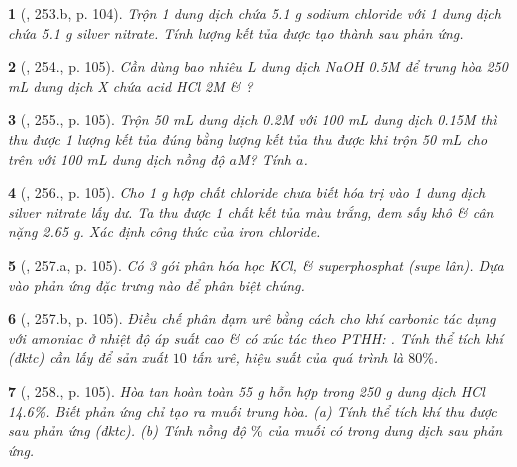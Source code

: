 \documentclass{article}
\newtheorem{baitoan}{}
\begin{document}
\begin{baitoan}[\cite{Nguyen_Buu_Can_500_BT_Hoa_Hoc_THCS}, 253.b, p. 104]
	Trộn 1 dung dịch chứa {\rm5.1 g} sodium chloride với 1 dung dịch chứa {\rm5.1 g} silver nitrate. Tính lượng kết tủa được tạo thành sau phản ứng.
\end{baitoan}

\begin{baitoan}[\cite{Nguyen_Buu_Can_500_BT_Hoa_Hoc_THCS}, 254., p. 105]
	Cần dùng bao nhiêu {\rm L} dung dịch {\rm NaOH 0.5M} để trung hòa {\rm250 mL} dung dịch X chứa acid {\rm HCl 2M \& }?
\end{baitoan}

\begin{baitoan}[\cite{Nguyen_Buu_Can_500_BT_Hoa_Hoc_THCS}, 255., p. 105]
	Trộn {\rm50 mL} dung dịch {\rm{} 0.2M} với {\rm100 mL} dung dịch {\rm{} 0.15M} thì thu được 1 lượng kết tủa đúng bằng lượng kết tủa thu được khi trộn {\rm50 mL } cho trên với {\rm100 mL} dung dịch {\rm{}} nồng độ $a${\rm M}? Tính $a$.
\end{baitoan}

\begin{baitoan}[\cite{Nguyen_Buu_Can_500_BT_Hoa_Hoc_THCS}, 256., p. 105]
	Cho {\rm1 g} hợp chất chloride chưa biết hóa trị vào 1 dung dịch silver nitrate lấy dư. Ta thu được 1 chất kết tủa màu trắng, đem sấy khô \& cân nặng {\rm2.65 g}. Xác định công thức của iron chloride.
\end{baitoan}

\begin{baitoan}[\cite{Nguyen_Buu_Can_500_BT_Hoa_Hoc_THCS}, 257.a, p. 105]
	Có 3 gói phân hóa học {\rm KCl, } \& superphosphat (supe lân). Dựa vào phản ứng đặc trưng nào để phân biệt chúng.
\end{baitoan}

\begin{baitoan}[\cite{Nguyen_Buu_Can_500_BT_Hoa_Hoc_THCS}, 257.b, p. 105]
	Điều chế phân đạm urê bằng cách cho khí carbonic tác dụng với amoniac {\rm{}} ở nhiệt độ áp suất cao \& có xúc tác theo {\rm PTHH}: {\rm{}}. Tính thể tích khí {\rm{}} (đktc) cần lấy để sản xuất $10$ tấn urê, hiệu suất của quá trình là $80\%$.
\end{baitoan}

\begin{baitoan}[\cite{Nguyen_Buu_Can_500_BT_Hoa_Hoc_THCS}, 258., p. 105]
	Hòa tan hoàn toàn {\rm55 g} hỗn hợp {\rm{}} trong {\rm250 g} dung dịch {\rm HCl 14.6\%}. Biết phản ứng chỉ tạo ra muối trung hòa. (a) Tính thể tích khí thu được sau phản ứng (đktc). (b) Tính nồng độ $\%$ của muối có trong dung dịch sau phản ứng.
\end{baitoan}
\end{document}
